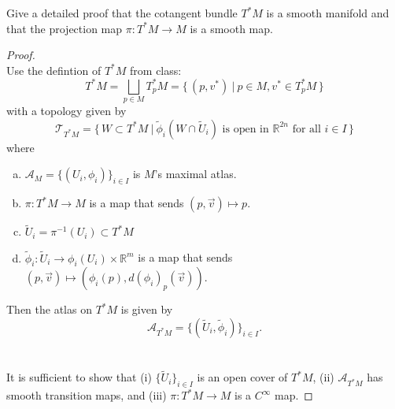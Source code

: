 \documentclass{article}
\newenvironment{problem}[2][Problem]{\begin{trivlist}
\item[\hskip \labelsep {\bfseries #1}\hskip \labelsep {\bfseries #2.}]}{\end{trivlist}}
\begin{document}
\pagebreak

\begin{problem}{4}
  Give a detailed proof that the cotangent bundle $T^*M$ is a smooth manifold
  and that the projection map $\pi\colon T^*M \rightarrow M$ is a smooth map.
\end{problem}

\begin{proof} \text{}\\
  Use the defintion of $T^*M$ from class: \[
    T^*M
      = \bigsqcup_{p \in M} T_p^*M
      = \{\, (p, v^*)\ |\ p \in M, v^* \in T_p^*M\,\}
  \] with a topology given by \[
    \mathcal{T}_{T^*M} = \{\, W \subset T^*M\ |\ \widetilde{\phi}_i(W \cap \widetilde{U}_i) \text{ is open in } \mathbb{R}^{2n} \text{ for all } i \in I \,\}
  \] where \begin{enumerate}[(a)]
    \item $\displaystyle \mathcal{A}_M = \{(U_i, \phi_i)\}_{i \in I}$ is $M$'s
      maximal atlas.
    \item $\displaystyle \pi\colon T^*M \rightarrow M$ is a map that sends
      $(p, \vec{v}) \mapsto p$.
    \item $\widetilde{U}_i = \pi^{-1}(U_i) \subset T^*M$
    \item $\widetilde{\phi}_i\colon \widetilde{U}_i \rightarrow \phi_i(U_i) \times \mathbb{R}^{m}$
      is a map that sends
      $(p, \vec{v}) \mapsto (\phi_i(p), d(\phi_i)_p(\vec{v}))$.
  \end{enumerate}
  Then the atlas on $T^*M$ is given by \[
    \mathcal{A}_{T^*M} = \{(\widetilde{U}_i, \widetilde{\phi}_i)\}_{i \in I}.
  \] \\~\\
  It is sufficient to show that
  (i) $\{\widetilde{U}_i\}_{i \in I}$ is an open cover of $T^*M$,
  (ii) $\mathcal{A}_{T^*M}$ has smooth transition maps, and
  (iii) $\pi\colon T^*M \rightarrow M$ is a $C^\infty$ map.


\end{proof}
\end{document}
